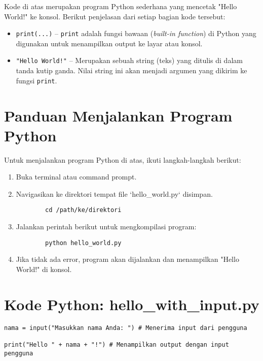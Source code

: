 Kode di atas merupakan program Python sederhana yang mencetak "Hello World!" ke konsol. Berikut penjelasan dari setiap bagian kode tersebut:

\begin{itemize}
\item \texttt{print(...)} – \texttt{print} adalah fungsi bawaan (\textit{built-in function}) di Python yang digunakan untuk menampilkan output ke layar atau konsol.
\item \texttt{"Hello World!"} – Merupakan sebuah string (teks) yang ditulis di dalam tanda kutip ganda. Nilai string ini akan menjadi argumen yang dikirim ke fungsi \texttt{print}.
\end{itemize}

\section{Panduan Menjalankan Program Python}

Untuk menjalankan program Python di atas, ikuti langkah-langkah berikut:

\begin{enumerate}
	\item Buka terminal atau command prompt.
	\item Navigasikan ke direktori tempat file `hello_world.py` disimpan.
	\begin{verbatim}
		cd /path/ke/direktori
	\end{verbatim}
	\item Jalankan perintah berikut untuk mengkompilasi program:
	\begin{verbatim}
		python hello_world.py
	\end{verbatim}
	\item Jika tidak ada error, program akan dijalankan dan menampilkan "Hello World!" di konsol.
\end{enumerate}

\section{Kode Python: hello_with_input.py}

\begin{lstlisting}[style=PythonStyle, caption={Kode Python: hello_with_input.py}]
nama = input("Masukkan nama Anda: ") # Menerima input dari pengguna

print("Hello " + nama + "!") # Menampilkan output dengan input pengguna
\end{lstlisting}

